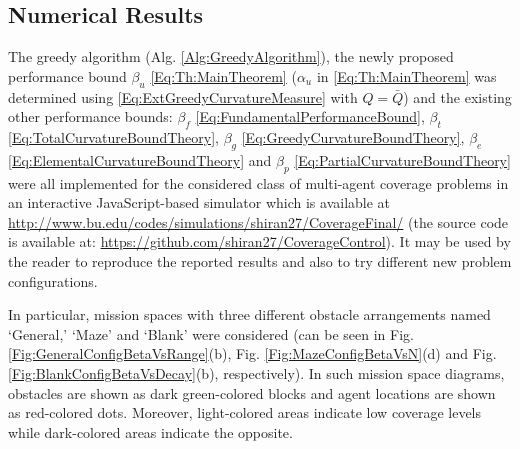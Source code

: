 \documentclass[conference]{IEEEtran}
\begin{document}
\subsection{Numerical Results}

The greedy algorithm (Alg. \ref{Alg:GreedyAlgorithm}), the newly proposed performance bound $\beta_u$ \eqref{Eq:Th:MainTheorem} ($\alpha_u$ in \eqref{Eq:Th:MainTheorem} was determined using \eqref{Eq:ExtGreedyCurvatureMeasure} with $Q=\bar{Q}$) and the existing other performance bounds: $\beta_f$ \eqref{Eq:FundamentalPerformanceBound}, $\beta_t$ \eqref{Eq:TotalCurvatureBoundTheory}, $\beta_g$ \eqref{Eq:GreedyCurvatureBoundTheory}, $\beta_e$ \eqref{Eq:ElementalCurvatureBoundTheory} and $\beta_p$ \eqref{Eq:PartialCurvatureBoundTheory} were all implemented for the considered class of multi-agent coverage problems in an interactive JavaScript-based simulator which is available at \url{http://www.bu.edu/codes/simulations/shiran27/CoverageFinal/} (the source code is available at: \url{https://github.com/shiran27/CoverageControl}). It may be used by the reader to reproduce the reported results and also to try different new problem configurations.   


In particular, mission spaces with three different obstacle arrangements named `General,' `Maze' and `Blank' were considered (can be seen in Fig. \ref{Fig:GeneralConfigBetaVsRange}(b), Fig. \ref{Fig:MazeConfigBetaVsN}(d) and Fig. \ref{Fig:BlankConfigBetaVsDecay}(b), respectively). In such mission space diagrams, obstacles are shown as dark green-colored blocks and agent locations are shown as red-colored dots. Moreover, light-colored areas indicate low coverage levels while dark-colored areas indicate the opposite.
\end{document}
